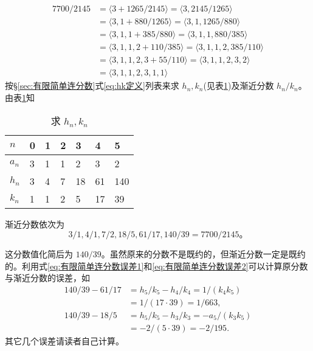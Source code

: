 \begin{solution}
	\begin{align*}
		7700/2145 & = \langle 3 + 1265/2145 \rangle = \langle 3, 2145/1265 \rangle               \\
		          & = \langle 3, 1 + 880/1265 \rangle = \langle 3, 1, 1265/880 \rangle           \\
		          & = \langle 3, 1, 1 + 385/880 \rangle = \langle 3, 1, 1, 880/385 \rangle       \\
		          & = \langle 3, 1, 1, 2 + 110/385 \rangle = \langle 3, 1, 1, 2, 385/110 \rangle \\
		          & = \langle 3, 1, 1, 2, 3 + 55/110 \rangle = \langle 3, 1, 1, 2, 3, 2 \rangle  \\
		          & = \langle 3, 1, 1, 2, 3, 1, 1 \rangle
	\end{align*}
	按\S\ref{sec:有限简单连分数}式\eqref{eq:hk定义}列表来求 \( h_n, k_n \)(见表\ref{tab:求hnkn})及渐近分数 \( h_n/k_n
	\)。由表\ref{tab:求hnkn}知
	\begin{table}[htbp]
		\centering
		\begin{tabularx}{\textwidth}{XXXXXXX}\toprule
			\( n \)   & 0 & 1 & 2 & 3  & 4  & 5   \\ \midrule
			\( a_n \) & 3 & 1 & 1 & 2  & 3  & 2   \\
			\( h_n \) & 3 & 4 & 7 & 18 & 61 & 140 \\
			\( k_n \) & 1 & 1 & 2 & 5  & 17 & 39  \\\bottomrule
		\end{tabularx}
		\caption{求 \( h_n, k_n \)}
		\label{tab:求hnkn}
	\end{table}

	渐近分数依次为
	\begin{equation*}
		3/1, 4/1, 7/2, 18/5, 61/17, 140/39 = 7700/2145。
	\end{equation*}

	这分数值化简后为 \( 140/39
	\)。虽然原来的分数不是既约的，但渐近分数一定是既约的。利用式\eqref{eq:有限简单连分数误差1}和\eqref{eq:有限简单连分数误差2}可以计算原分数与渐近分数的误差，如
	\begin{align*}
		140/39 - 61/17 & = h_5/k_5 - h_4/k_4 = 1/(k_4k_5)    \\
		               & = 1 / (17 \cdot 39) = 1 / 663,      \\
		140/39 - 18/5  & = h_5/k_5 - h_3/k_3 = -a_5/(k_3k_5) \\
		               & = -2/(5\cdot39) = -2/195.
	\end{align*}
	其它几个误差请读者自己计算。
\end{solution}

